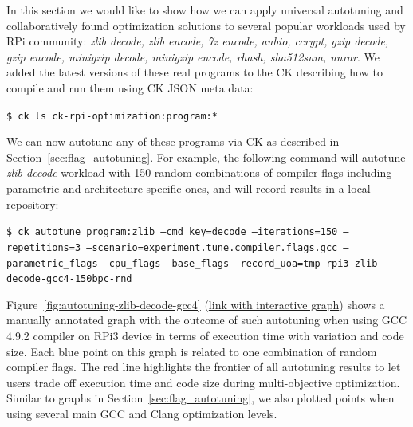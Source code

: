In this section we would like to show how we can apply universal autotuning 
and collaboratively found optimization solutions to several popular workloads
used by RPi community: \textit{zlib decode, zlib encode, 
7z encode, aubio, ccrypt, gzip decode, gzip encode, minigzip decode, 
minigzip encode, rhash, sha512sum, unrar}.
%
We added the latest versions of these real programs 
to the CK describing how to compile and run them 
using CK JSON meta data:

\begin{flushleft}
\texttt{\$ ck ls ck-rpi-optimization:program:*}
\end{flushleft}

We can now autotune any of these programs via CK as described in Section~\ref{sec:flag_autotuning}.
%
For example, the following command will autotune \textit{zlib decode} workload
with 150 random combinations of compiler flags including parametric and architecture 
specific ones, and will record results in a local repository:

\begin{flushleft}
\texttt{\$ ck autotune program:zlib --cmd\_key=decode
  --iterations=150 --repetitions=3 
  --scenario=experiment.tune.compiler.flags.gcc
  --parametric\_flags --cpu\_flags --base\_flags 
  --record\_uoa=tmp-rpi3-zlib-decode-gcc4-150bpc-rnd}
\end{flushleft}

Figure~\ref{fig:autotuning-zlib-decode-gcc4} 
(\href{http://cknowledge.org/repo/web.php?wcid=graph:3a97d1f6494f9d45&subgraph=rpi3-autotuning-zlib-decode-gcc4-interactive}{link with interactive graph}) 
shows a manually annotated graph with the outcome of such autotuning 
when using GCC 4.9.2 compiler on RPi3 device
in terms of execution time with variation and code size.
%
Each blue point on this graph is related to one combination of random compiler flags.
%
The red line highlights the frontier of all autotuning results 
to let users trade off execution time and code size 
during multi-objective optimization.
%
Similar to graphs in Section~\ref{sec:flag_autotuning}, we also plotted points 
when using several main GCC and Clang optimization levels.


